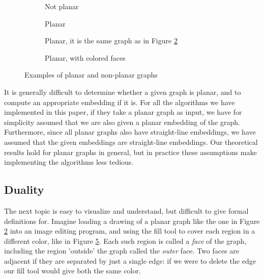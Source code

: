\begin{figure}
    \centering
    \begin{subfigure}{.23\textwidth}
        \centering
        
        \caption{Not planar}
        \label{figure:k33}
    \end{subfigure}\hfill%
    \begin{subfigure}{.23\textwidth}
        \centering
        
        \caption{Planar}
        \label{figure:k4-a}
    \end{subfigure}\hfill%
    \begin{subfigure}{.23\textwidth}
        \centering
        
        \caption{Planar, it is the same graph as in Figure \ref{figure:k4-a}}
        \label{figure:k4-b}
    \end{subfigure}\hfill%
    \begin{subfigure}{.23\textwidth}
        \centering
        
        \caption{Planar, with colored faces}
        \label{figure:k4-c}
    \end{subfigure}
    \caption{Examples of planar and non-planar graphs}
\end{figure}

It is generally difficult to determine whether a given graph is planar, and to compute an appropriate embedding if it is. For all the algorithms we have implemented in this paper, if they take a planar graph as input, we have for simplicity assumed that we are also given a planar embedding of the graph. Furthermore, since all planar graphs also have straight-line embeddings, we have assumed that the given embeddings are straight-line embeddings. Our theoretical results hold for planar graphs in general, but in practice these assumptions make implementing the algorithms less tedious.

\subsection{Duality}
The next topic is easy to visualize and understand, but difficult to give formal definitions for. Imagine loading a drawing of a planar graph like the one in Figure \ref{figure:k4-a} into an image editing program, and using the fill tool to cover each region in a different color, like in Figure \ref{figure:k4-c}. Each such region is called a \emph{face} of the graph, including the region 'outside' the graph called the \emph{outer} face. Two faces are adjacent if they are separated by just a single edge: if we were to delete the edge our fill tool would give both the same color.


